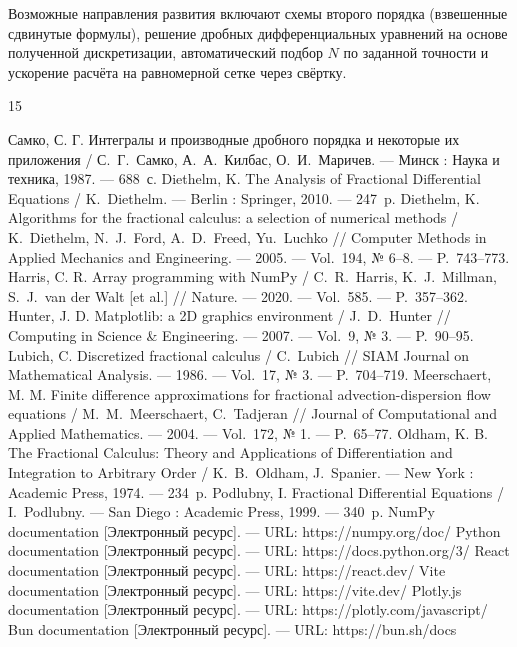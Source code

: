 \documentclass[14pt,a4paper]{extarticle}
\begin{document}
Возможные направления развития включают схемы второго порядка (взвешенные сдвинутые формулы), решение дробных дифференциальных уравнений на основе полученной дискретизации, автоматический подбор $N$ по заданной точности и ускорение расчёта на равномерной сетке через свёртку.

\clearpage
\begingroup
\raggedright
\begin{thebibliography}{15}
{}
 Самко, С. Г. Интегралы и производные дробного порядка и некоторые их приложения / С.~Г.~Самко, А.~А.~Килбас, О.~И.~Маричев. --- Минск : Наука и техника, 1987. --- 688~с.
 Diethelm, K. The Analysis of Fractional Differential Equations / K.~Diethelm. --- Berlin : Springer, 2010. --- 247~p.
 Diethelm, K. Algorithms for the fractional calculus: a selection of numerical methods / K.~Diethelm, N.~J.~Ford, A.~D.~Freed, Yu.~Luchko // Computer Methods in Applied Mechanics and Engineering. --- 2005. --- Vol.~194, № 6--8. --- P.~743--773.
 Harris, C. R. Array programming with NumPy / C.~R.~Harris, K.~J.~Millman, S.~J.~van der Walt [et al.] // Nature. --- 2020. --- Vol.~585. --- P.~357--362.
 Hunter, J. D. Matplotlib: a 2D graphics environment / J.~D.~Hunter // Computing in Science \& Engineering. --- 2007. --- Vol.~9, № 3. --- P.~90--95.
 Lubich, C. Discretized fractional calculus / C.~Lubich // SIAM Journal on Mathematical Analysis. --- 1986. --- Vol.~17, № 3. --- P.~704--719.
 Meerschaert, M. M. Finite difference approximations for fractional advection-dispersion flow equations / M.~M.~Meerschaert, C.~Tadjeran // Journal of Computational and Applied Mathematics. --- 2004. --- Vol.~172, № 1. --- P.~65--77.
 Oldham, K. B. The Fractional Calculus: Theory and Applications of Differentiation and Integration to Arbitrary Order / K.~B.~Oldham, J.~Spanier. --- New York : Academic Press, 1974. --- 234~p.
 Podlubny, I. Fractional Differential Equations / I.~Podlubny. --- San Diego : Academic Press, 1999. --- 340~p.
 NumPy documentation [Электронный ресурс]. --- URL: https://numpy.org/doc/
 Python documentation [Электронный ресурс]. --- URL: https://docs.python.org/3/
 React documentation [Электронный ресурс]. --- URL: https://react.dev/
 Vite documentation [Электронный ресурс]. --- URL: https://vite.dev/
 Plotly.js documentation [Электронный ресурс]. --- URL: https://plotly.com/javascript/
 Bun documentation [Электронный ресурс]. --- URL: https://bun.sh/docs
\end{thebibliography}
\endgroup
\end{document}
